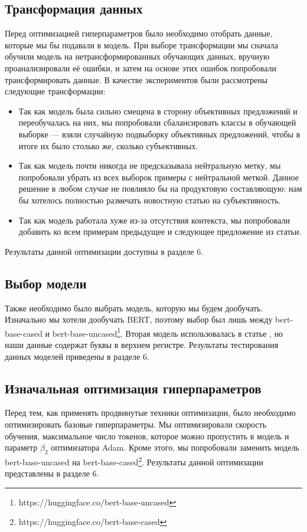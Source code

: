 \documentclass[a4paper,14pt]{extarticle}
\begin{document}
    \subsection{Трансформация данных}
    Перед оптимизацией гиперпараметров было необходимо отобрать данные, которые мы бы подавали в модель. При выборе трансформации мы сначала обучили модель на нетрансформированных обучающих данных, вручную проанализировали её ошибки, и затем на основе этих ошибок попробовали трансформировать данные. В качестве экспериментов были рассмотрены следующие трансформации:
    \begin{itemize}
        \item Так как модель была сильно смещена в сторону объективных предложений и переобучалась на них, мы попробовали сбалансировать классы в обучающей выборке --- взяли случайную подвыборку объективных предложений, чтобы в итоге их было столько же, сколько субъективных.
        \item Так как модель почти никогда не предсказывала нейтральную метку, мы попробовали убрать из всех выборок примеры с нейтральной меткой. Данное решение в любом случае не повлияло бы на продуктовую составляющую: нам бы хотелось полностью размечать новостную статью на субъективность.
        \item Так как модель работала хуже из-за отсутствия контекста, мы попробовали добавить ко всем примерам предыдущее и следующее предложение из статьи. 
    \end{itemize}
    Результаты данной оптимизации доступны в разделе 6.

    \subsection{Выбор модели}
    Также необходимо было выбрать модель, которую мы будем дообучать. Изначально мы хотели дообучать BERT, поэтому выбор был лишь между bert-base-cased и bert-base-uncased\footnote{https://huggingface.co/bert-base-uncased}. Вторая модель использовалась в статье \cite{bert-finetune}, но наши данные содержат буквы в верхнем регистре. Результаты тестирования данных моделей приведены в разделе 6.

    \subsection{Изначальная оптимизация гиперпараметров}
    Перед тем, как применять продвинутые техники оптимизации, было необходимо оптимизировать базовые гиперпараметры. Мы оптимизировали скорость обучения, максимальное число токенов, которое можно пропустить в модель и параметр $\beta_2$ оптимизатора Adam. Кроме этого, мы попробовали заменить модель bert-base-uncased на bert-base-cased\footnote{https://huggingface.co/bert-base-cased}. Результаты данной оптимизации представлены в разделе 6.
    
\end{document}
